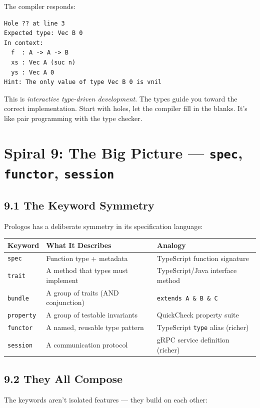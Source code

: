 \documentclass[11pt]{article}
\begin{document}
The compiler responds:

\begin{verbatim}
Hole ?? at line 3
Expected type: Vec B 0
In context:
  f  : A -> A -> B
  xs : Vec A (suc n)
  ys : Vec A 0
Hint: The only value of type Vec B 0 is vnil
\end{verbatim}

This is \emph{interactive type-driven development}. The types guide you toward
the correct implementation. Start with holes, let the compiler fill in
the blanks. It's like pair programming with the type checker.
\section{Spiral 9: The Big Picture --- \texttt{spec}, \texttt{functor}, \texttt{session}}
\label{sec:orgfe0b6f9}

\subsection{9.1 The Keyword Symmetry}
\label{sec:org1d9070c}

Prologos has a deliberate symmetry in its specification language:

\begin{center}
\begin{tabular}{lll}
Keyword & What It Describes & Analogy\\
\hline
\texttt{spec} & Function type + metadata & TypeScript function signature\\
\texttt{trait} & A method that types must implement & TypeScript/Java interface method\\
\texttt{bundle} & A group of traits (AND conjunction) & \texttt{extends A \& B \& C}\\
\texttt{property} & A group of testable invariants & QuickCheck property suite\\
\texttt{functor} & A named, reusable type pattern & TypeScript \texttt{type} alias (richer)\\
\texttt{session} & A communication protocol & gRPC service definition (richer)\\
\end{tabular}
\end{center}
\subsection{9.2 They All Compose}
\label{sec:org8cc0494}

The keywords aren't isolated features --- they build on each other:
\end{document}
